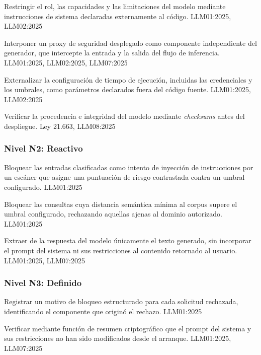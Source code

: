   {Restringir el rol, las capacidades y las limitaciones del modelo mediante instrucciones de sistema declaradas externamente al código.}
  {LLM01:2025, LLM02:2025}

  {Interponer un proxy de seguridad desplegado como componente independiente del generador, que intercepte la entrada y la salida del flujo de inferencia.}
  {LLM01:2025, LLM02:2025, LLM07:2025}

  {Externalizar la configuración de tiempo de ejecución, incluidas las credenciales y los umbrales, como parámetros declarados fuera del código fuente.}
  {LLM01:2025, LLM02:2025}

  {Verificar la procedencia e integridad del modelo mediante \textit{checksums} antes del despliegue.}
  {Ley 21.663, LLM08:2025}

\subsubsection*{Nivel N2: Reactivo}

  {Bloquear las entradas clasificadas como intento de inyección de instrucciones por un escáner que asigne una puntuación de riesgo contrastada contra un umbral configurado.}
  {LLM01:2025}

  {Bloquear las consultas cuya distancia semántica mínima al corpus supere el umbral configurado, rechazando aquellas ajenas al dominio autorizado.}
  {LLM01:2025}

  {Extraer de la respuesta del modelo únicamente el texto generado, sin incorporar el prompt del sistema ni sus restricciones al contenido retornado al usuario.}
  {LLM01:2025, LLM07:2025}

\subsubsection*{Nivel N3: Definido}

  {Registrar un motivo de bloqueo estructurado para cada solicitud rechazada, identificando el componente que originó el rechazo.}
  {LLM01:2025}

  {Verificar mediante función de resumen criptográfico que el prompt del sistema y sus restricciones no han sido modificados desde el arranque.}
  {LLM01:2025, LLM07:2025}

